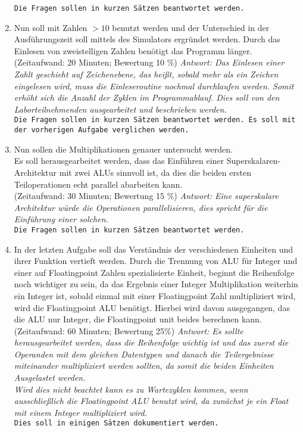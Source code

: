 \documentclass[a4paper,ngerman]{scrartcl}
\begin{document}
\begin{enumerate}
   \texttt{Die Fragen sollen in kurzen Sätzen beantwortet werden.}
    \item  Nun soll mit Zahlen  $> 10$ benutzt werden und der Unterschied in der Ausführungszeit soll mittels des Simulators ergründet werden.  
    Durch das Einlesen von zweistelligen Zahlen benötigt das Programm länger.
    \newline (Zeitaufwand: 20 Minuten; Bewertung 10 \%)
    \newline 
    \textit{Antwort: Das Einlesen einer Zahlt geschieht auf Zeichenebene, das heißt, sobald mehr als ein Zeichen eingelesen wird, muss die Einleseroutine nochmal durchlaufen werden. Somit erhöht sich die Anzahl der Zyklen im Programmablauf. Dies soll von den Laborteilnehmenden ausgearbeitet und beschrieben werden.}\\
    \texttt{Die Fragen sollen in kurzen Sätzen beantwortet werden. Es soll mit der vorherigen Aufgabe verglichen werden.}
    \item Nun sollen die Multiplikationen genauer untersucht werden. \\
    Es soll herausgearbeitet werden, dass das Einführen einer Superskalaren-Architektur mit zwei ALUs sinnvoll ist, da dies die beiden ersten Teiloperationen echt parallel abarbeiten kann. \\
    (Zeitaufwand: 30 Minuten; Bewertung 15 \%)
     \newline  
     \textit{Antwort: Eine superskalare Architektur würde die Operationen parallelisieren, dies spricht für die Einführung einer solchen.} \\
    \texttt{Die Fragen sollen in kurzen Sätzen beantwortet werden.} 
    
    \item In der letzten Aufgabe soll das Verständnis der verschiedenen Einheiten und ihrer Funktion vertieft werden. Durch die Trennung von ALU für Integer und einer auf  Floatingpoint Zahlen spezialisierte Einheit, beginnt die Reihenfolge noch wichtiger zu sein, da das Ergebnis einer Integer Multiplikation weiterhin ein Integer ist, sobald einmal mit einer Floatingpoint Zahl multipliziert wird, wird die Floatingpoint ALU benötigt. Hierbei wird davon ausgegangen, das die ALU nur Integer, die Floatingpoint unit beides berechnen kann. \newline
    (Zeitaufwand: 60 Minuten; Bewertung 25\%)\newline  
    \textit{Antwort: Es sollte herausgearbeitet werden, dass die Reihenfolge wichtig ist und das zuerst die Operanden mit dem gleichen Datentypen und danach die Teilergebnisse miteinander multipliziert werden sollten, da somit die beiden Einheiten Ausgelastet werden. \\ 
    Wird dies nicht beachtet kann es zu Wartezyklen kommen, wenn ausschließlich die Floatingpoint ALU benutzt wird, da zunächst je ein Float mit einem Integer multipliziert wird.}\\
    \texttt{Dies soll in einigen Sätzen dokumentiert werden.}
\end{enumerate}
\end{document}
